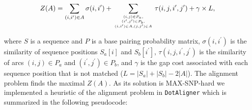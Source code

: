 \documentclass[a4paper,twoside]{article}
\newcommand\dotaligner{\texttt{DotAligner}}
\begin{document}
\begin{equation}\label{eq1}
	Z(A) = \sum_{(i,i^\prime) \in A} \sigma(i,i^\prime) + \sum_{(i,j) \in
	P_a,\atop {(i^\prime,j^\prime) \in P_b,\atop {(i,i^\prime) \in
	A, (j,j^\prime) \in A}}} \tau(i,j,i^\prime,j^\prime) + \gamma
	\times L,
\end{equation}

where $S$ is a sequence and $P$ is a base pairing probability matrix,
$\sigma(i,i^\prime)$ is the similarity of sequence positions $S_a[i]$ and
$S_b[i^\prime]$, $\tau(i,j,i^\prime,j^\prime)$ is the similarity of arcs $(i,j)
\in P_a$ and $(i^\prime,j^\prime) \in P_b$,
and $\gamma$ is the gap cost
associated with each sequence position that is not matched ($L =
|S_a|+|S_b|-2|A|$). The alignment problem finds the maximal $Z(A)$. As its
solution is MAX-SNP-hard we implemented a heuristic of the alignment problem in
\dotaligner{} which is summarized in the following pseudocode:
\end{document}
